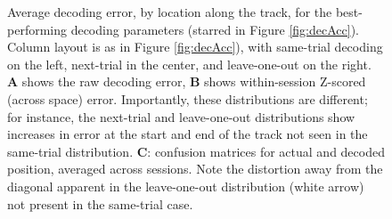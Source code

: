 \documentclass[11pt]{article}
\newcommand{\bsf}[1]{\textbf{#1}}
\begin{document}
\begin{figure}[h]
  \centering
  \caption{Average decoding error, by location along the track, for
    the best-performing decoding parameters (starred in Figure
    \ref{fig:decAcc}). Column layout is as in Figure
    \ref{fig:decAcc}), with same-trial decoding on the left,
    next-trial in the center, and leave-one-out on the right. \bsf{A}
    shows the raw decoding error, \bsf{B} shows within-session
    Z-scored (across space) error. {\color{black} Importantly}, these
    distributions are different; for instance, the next-trial and
    leave-one-out distributions show increases in error at the start
    and end of the track not seen in the same-trial
    distribution. \bsf{C}: confusion matrices for actual and decoded
    position, averaged across sessions. {\color{black} Note the
      distortion away from the diagonal apparent in the leave-one-out
      distribution (white arrow) not present in the same-trial case.}}
  \label{fig:decAccSpace}
\end{figure}
\end{document}
